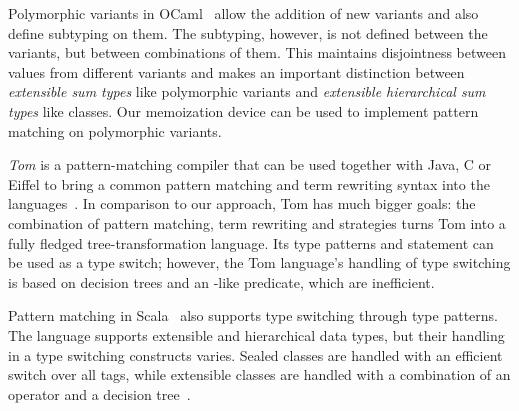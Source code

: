 Polymorphic variants in OCaml~\cite{garrigue-98} allow the addition of new 
variants and also define subtyping on them. The subtyping, however, is not 
defined between the variants, but between combinations of them. 
This maintains disjointness between values from different variants and makes an 
important distinction between \emph{extensible sum types} like polymorphic 
variants and \emph{extensible hierarchical sum types} like classes. Our 
memoization device can be used to implement pattern matching on polymorphic 
variants.

\emph{Tom} is a pattern-matching compiler that can be used together with Java, C or 
Eiffel to bring a common pattern matching and term rewriting syntax into the 
languages~\cite{Moreau:2003}. In comparison to our approach, Tom has much bigger 
goals: the combination of pattern matching, term rewriting and strategies turns 
Tom into a fully fledged tree-transformation language. Its type patterns and 
statement can be used as a type switch; however, the Tom language's handling of type 
switching is based on decision trees and an -like predicate, 
which are inefficient.

Pattern matching in Scala~\cite{Scala2nd} also supports type switching through 
type patterns. The language supports extensible and hierarchical data types, but
their handling in a type switching constructs varies. Sealed classes are handled 
with an efficient switch over all tags, while extensible classes are  
handled with a combination of an  operator and a decision 
tree~\cite{EmirThesis}.